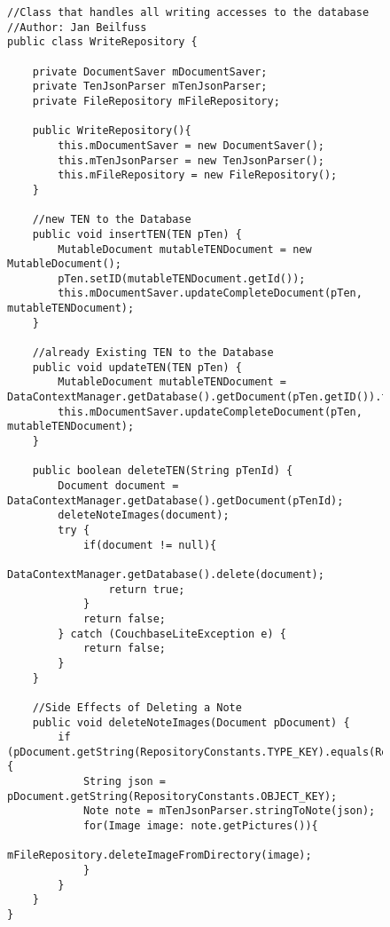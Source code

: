 \begin{figure}[H]
\begin{lstlisting}[caption=WriteRepository (Jan Beilfuß)]
//Class that handles all writing accesses to the database
//Author: Jan Beilfuss
public class WriteRepository {

    private DocumentSaver mDocumentSaver;
    private TenJsonParser mTenJsonParser;
    private FileRepository mFileRepository;

    public WriteRepository(){
        this.mDocumentSaver = new DocumentSaver();
        this.mTenJsonParser = new TenJsonParser();
        this.mFileRepository = new FileRepository();
    }

    //new TEN to the Database
    public void insertTEN(TEN pTen) {
        MutableDocument mutableTENDocument = new MutableDocument();
        pTen.setID(mutableTENDocument.getId());
        this.mDocumentSaver.updateCompleteDocument(pTen, mutableTENDocument);
    }

    //already Existing TEN to the Database
    public void updateTEN(TEN pTen) {
        MutableDocument mutableTENDocument = DataContextManager.getDatabase().getDocument(pTen.getID()).toMutable();
        this.mDocumentSaver.updateCompleteDocument(pTen, mutableTENDocument);
    }

    public boolean deleteTEN(String pTenId) {
        Document document = DataContextManager.getDatabase().getDocument(pTenId);
        deleteNoteImages(document);
        try {
            if(document != null){
                DataContextManager.getDatabase().delete(document);
                return true;
            }
            return false;
        } catch (CouchbaseLiteException e) {
            return false;
        }
    }

    //Side Effects of Deleting a Note
    public void deleteNoteImages(Document pDocument) {
        if (pDocument.getString(RepositoryConstants.TYPE_KEY).equals(RepositoryConstants.NOTE_TYPE)) {
            String json = pDocument.getString(RepositoryConstants.OBJECT_KEY);
            Note note = mTenJsonParser.stringToNote(json);
            for(Image image: note.getPictures()){
                mFileRepository.deleteImageFromDirectory(image);
            }
        }
    }
}
\end{lstlisting}
\end{figure}
